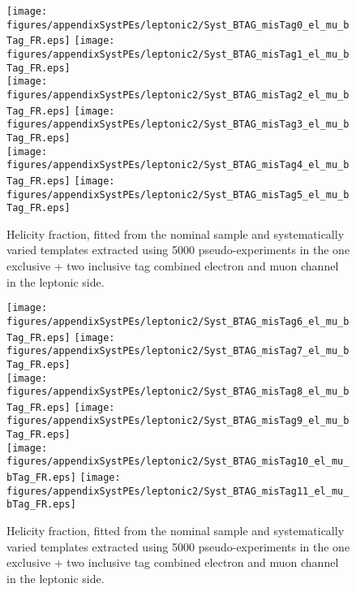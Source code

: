 \begin{figure}[!hb]
\begin{center}
        \texttt{[image: figures/appendixSystPEs/leptonic2/Syst\_BTAG\_misTag0\_el\_mu\_bTag\_FR.eps]}
        \texttt{[image: figures/appendixSystPEs/leptonic2/Syst\_BTAG\_misTag1\_el\_mu\_bTag\_FR.eps]}\\
        \texttt{[image: figures/appendixSystPEs/leptonic2/Syst\_BTAG\_misTag2\_el\_mu\_bTag\_FR.eps]}
        \texttt{[image: figures/appendixSystPEs/leptonic2/Syst\_BTAG\_misTag3\_el\_mu\_bTag\_FR.eps]}\\
        \texttt{[image: figures/appendixSystPEs/leptonic2/Syst\_BTAG\_misTag4\_el\_mu\_bTag\_FR.eps]}
        \texttt{[image: figures/appendixSystPEs/leptonic2/Syst\_BTAG\_misTag5\_el\_mu\_bTag\_FR.eps]}
        
\caption{Helicity fraction, \fr fitted from the nominal \ttbar sample and systematically varied templates extracted using 5000 pseudo-experiments in the one exclusive + two inclusive \bt tag combined electron and muon channel in the leptonic side. }
\label{fig:systematicVar_lep_fR_elmu2incl_btag3_1}
\end{center}
\end{figure}

\begin{figure}[!hb]
\begin{center}
        \texttt{[image: figures/appendixSystPEs/leptonic2/Syst\_BTAG\_misTag6\_el\_mu\_bTag\_FR.eps]}
        \texttt{[image: figures/appendixSystPEs/leptonic2/Syst\_BTAG\_misTag7\_el\_mu\_bTag\_FR.eps]}\\
        \texttt{[image: figures/appendixSystPEs/leptonic2/Syst\_BTAG\_misTag8\_el\_mu\_bTag\_FR.eps]}
        \texttt{[image: figures/appendixSystPEs/leptonic2/Syst\_BTAG\_misTag9\_el\_mu\_bTag\_FR.eps]}\\
        \texttt{[image: figures/appendixSystPEs/leptonic2/Syst\_BTAG\_misTag10\_el\_mu\_bTag\_FR.eps]}
        \texttt{[image: figures/appendixSystPEs/leptonic2/Syst\_BTAG\_misTag11\_el\_mu\_bTag\_FR.eps]}
        
\caption{Helicity fraction, \fr fitted from the nominal \ttbar sample and systematically varied templates extracted using 5000 pseudo-experiments in the one exclusive + two inclusive \bt tag combined electron and muon channel in the leptonic side. }
\label{fig:systematicVar_lep_fR_elmu2incl_btag3_2}
\end{center}
\end{figure}


